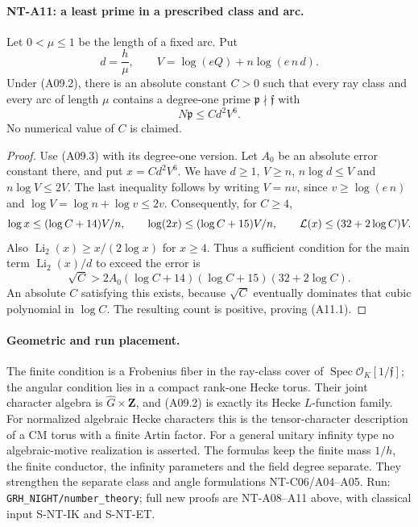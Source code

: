 \paragraph{NT-A11: a least prime in a prescribed class and arc.}
Let \(0<\mu\le1\) be the length of a fixed arc. Put
\[
 d=\frac h\mu,\qquad
 V=\log(eQ)+n\log(e\,n\,d).
 \]
Under (A09.2), there is an absolute constant \(C>0\) such
that every ray class and every arc of length \(\mu\) contains
a degree-one prime \(\mathfrak p\nmid\mathfrak f\) with
\[
                       N\mathfrak p\le C d^2 V^6 .      \tag{A11.1}
\]
No numerical value of \(C\) is claimed.

\begin{proof}
Use (A09.3) with its degree-one version. Let \(A_0\) be an
absolute error constant there, and put \(x=C d^2 V^6\).
We have \(d\ge1\), \(V\ge n\), \(n\log d\le V\) and
\(n\log V\le2V\). The last inequality follows by writing
\(V=nv\), since \(v\ge\log(e\,n)\) and
\(\log V=\log n+\log v\le2v\).
Consequently, for \(C\ge4\),
\[
 \log x\le(\log C+14)V/n,\qquad
 \log(2x)\le(\log C+15)V/n,\qquad
 {\cal L}(x)\le(32+2\log C)V .
 \]
Also \(\operatorname{Li}_2(x)\ge x/(2\log x)\) for \(x\ge4\).
Thus a sufficient condition for the main term
\(\operatorname{Li}_2(x)/d\) to exceed the error is
\[
 \sqrt C>
 2A_0(\log C+14)(\log C+15)(32+2\log C).
 \]
An absolute \(C\) satisfying this exists, because \(\sqrt C\)
eventually dominates that cubic polynomial in \(\log C\).
The resulting count is positive, proving (A11.1).
\end{proof}

\paragraph{Geometric and run placement.}
The finite condition is a Frobenius fiber in the ray-class
cover of \(\operatorname{Spec}\mathcal O_K[1/\mathfrak f]\);
the angular condition lies in a compact rank-one Hecke torus.
Their joint character algebra is
\(\widehat G\times\mathbf Z\), and (A09.2) is exactly its
Hecke \(L\)-function family. For normalized algebraic Hecke
characters this is the tensor-character description of a CM
torus with a finite Artin factor. For a general unitary
infinity type no algebraic-motive realization is asserted.
The formulas keep the finite mass \(1/h\), the finite
conductor, the infinity parameters and the field degree
separate. They strengthen the separate class and angle
formulations NT-C06/A04--A05. Run:
\texttt{GRH\_NIGHT/number\_theory}; full new proofs are
NT-A08--A11 above, with classical input S-NT-IK and S-NT-ET.



